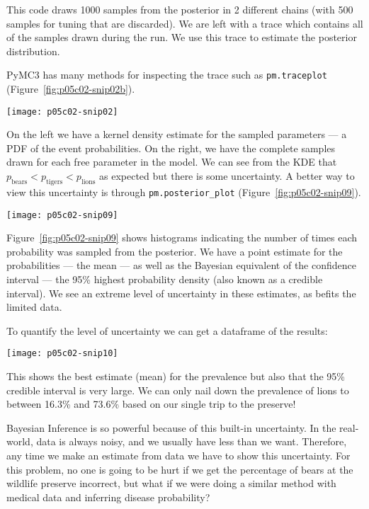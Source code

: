 This code draws 1000 samples from the posterior in 2 different chains (with 500 samples for tuning that are discarded). We are left with a trace which contains all of the samples drawn during the run. We use this trace to estimate the posterior distribution.

PyMC3 has many methods for inspecting the trace such as \lstinline{pm.traceplot} (Figure~\ref{fig:p05c02-snip02b}).

\begin{figure*}[h]
    \texttt{[image: p05c02-snip02]}
    \caption{PDF and trace of samples}
    \label{fig:p05c02-snip02b}
\end{figure*}

On the left we have a kernel density estimate for the sampled parameters --- a PDF of the event probabilities. On the right, we have the complete samples drawn for each free parameter in the model. We can see from the KDE that $p_\textrm{bears}<p_\textrm{tigers}<p_\textrm{lions}$ as expected but there is some uncertainty. A better way to view this uncertainty is through \lstinline{pm.posterior_plot} (Figure~\ref{fig:p05c02-snip09}).

\begin{figure*}[h]
    \texttt{[image: p05c02-snip09]}
    \caption{Posterior plots from PyMC3}
    \label{fig:p05c02-snip09}
\end{figure*}

Figure~\ref{fig:p05c02-snip09} shows histograms indicating the number of times each probability was sampled from the posterior. We have a point estimate for the probabilities --- the mean --- as well as the Bayesian equivalent of the confidence interval --- the 95\% highest probability density (also known as a credible interval). We see an extreme level of uncertainty in these estimates, as befits the limited data.

To quantify the level of uncertainty we can get a dataframe of the results:

\begin{figure*}[h]
    \texttt{[image: p05c02-snip10]}
    \caption{Posterior plots from PyMC3}
\end{figure*}

This shows the best estimate (mean) for the prevalence but also that the 95\% credible interval is very large. We can only nail down the prevalence of lions to between 16.3\% and 73.6\% based on our single trip to the preserve!

Bayesian Inference is so powerful because of this built-in uncertainty. In the real-world, data is always noisy, and we usually have less than we want. Therefore, any time we make an estimate from data we have to show this uncertainty. For this problem, no one is going to be hurt if we get the percentage of bears at the wildlife preserve incorrect, but what if we were doing a similar method with medical data and inferring disease probability?

